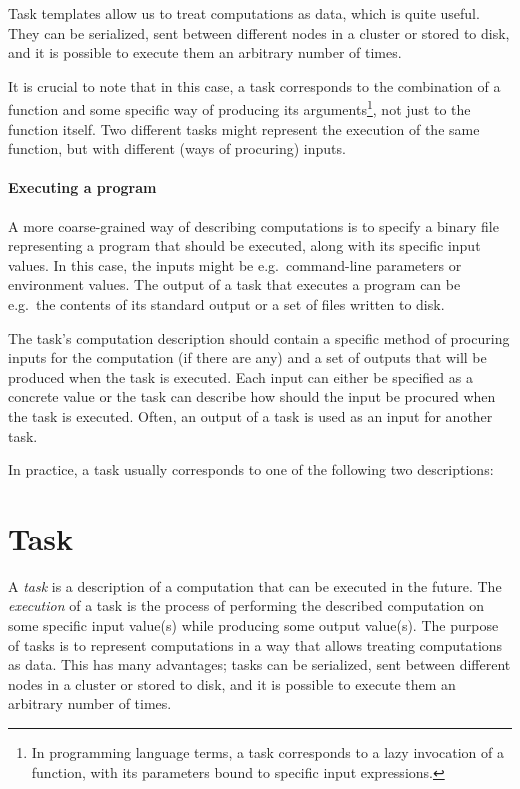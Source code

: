 Task templates allow us to treat computations as data, which is quite useful. They can be
serialized, sent between different nodes in a cluster or stored to disk, and it is possible to
execute them an arbitrary number of times.

It is crucial to note that in this case, a task corresponds to the combination of a function and
some specific way of producing its arguments\footnote{In programming language terms, a task corresponds to a lazy invocation of a function, with its parameters bound to specific input expressions.}, not just to the function
itself. Two different tasks might represent the execution of the same function, but with different
(ways of procuring) inputs.

\paragraph{Executing a program} A more coarse-grained way of describing computations is to specify
a binary file representing a program that should be executed, along with its specific input values.
In this case, the inputs might be e.g.\ command-line parameters or environment values. The output
of a task that executes a program can be e.g.\ the contents of its standard output or a set of
files written to disk.

The task's computation description should contain a specific method of procuring inputs for the
computation (if there are any) and a set of outputs that will be produced when the task is
executed. Each input can either be specified as a concrete value or the task can describe how
should the input be procured when the task is executed. Often, an output of a task is used as an
input for another task.

In practice, a task usually corresponds to one of the following two descriptions:


\section{Task}
A \emph{task} is a description of a computation that can be executed in the future. The
\textit{execution} of a task is the process of performing the described computation on some
specific input value(s) while producing some output value(s). The purpose of tasks is to represent
computations in a way that allows treating computations as data. This has many advantages; tasks
can be serialized, sent between different nodes in a cluster or stored to disk, and it is possible
to execute them an arbitrary number of times.

